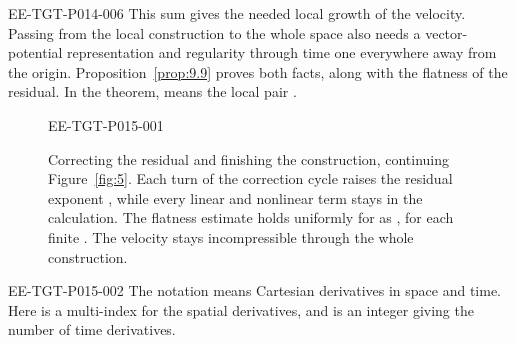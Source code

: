 \begin{EESegment}{EE-TGT-P014-006}
This sum gives the needed local growth of the velocity. Passing from the local construction
to the whole space also needs a vector-potential representation and regularity through time
one everywhere away from the origin. Proposition~\ref{prop:9.9} proves both facts, along with
the flatness of the residual. In the theorem,  means the local pair
.
\end{EESegment}

%
\begin{figure}[htbp]
  \centering
  \begin{EESegment}{EE-TGT-P015-001}
  \caption{Correcting the residual and finishing the construction, continuing
  Figure~\ref{fig:5}. Each turn of the correction cycle raises the residual exponent
  , while every linear and nonlinear term stays in the
  calculation. The flatness estimate holds uniformly for
   as
  , for each finite
  . The velocity stays incompressible through the whole
  construction.}
  \label{fig:6}
  \end{EESegment}
\end{figure}

\begin{EESegment}{EE-TGT-P015-002}
The notation  means Cartesian derivatives
in space and time. Here  is a multi-index for the spatial
derivatives, and  is an integer giving the number of time
derivatives.
\end{EESegment}

